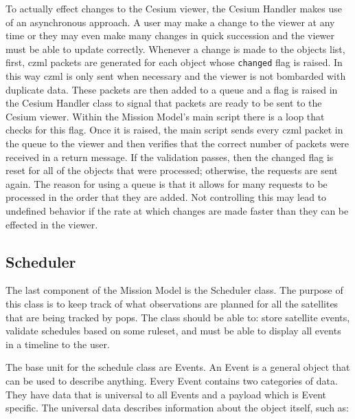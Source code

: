 To actually effect changes to the Cesium viewer, the Cesium Handler makes use
of an asynchronous approach. A user may make a change to the viewer at any time
or they may even make many changes in quick succession and the viewer must be
able to update correctly. Whenever a change is made to the objects list, first,
\gls{czml} packets are generated for each object whose \texttt{changed} flag is
raised. In this way \gls{czml} is only sent when necessary and the viewer is
not bombarded with duplicate data. These packets are then added to a queue and
a flag is raised in the Cesium Handler class to signal that packets are ready
to be sent to the Cesium viewer. Within the Mission Model's main script there
is a loop that checks for this flag. Once it is raised, the main script sends
every \gls{czml} packet in the queue to the viewer and then verifies that the
correct number of packets were received in a return message. If the validation
passes, then the changed flag is reset for all of the objects that were
processed; otherwise, the requests are sent again. The reason for using a queue
is that it allows for many requests to be processed in the order that they are
added.  Not controlling this may lead to undefined behavior if the rate at
which changes are made faster than they can be effected in the viewer.


\subsection{Scheduler}

The last component of the Mission Model is the Scheduler class. The purpose of
this class is to keep track of what observations are planned for all the
satellites that are being tracked by \gls{pops}. The class should be able to:
store satellite events, validate schedules based on some ruleset, and must be
able to display all events in a timeline to the user. 

The base unit for the schedule class are Events. An Event is a general object
that can be used to describe anything. Every Event contains two categories of
data. They have data that is universal to all Events and a payload which is
Event specific.  The universal data describes information about the object
itself, such as:

